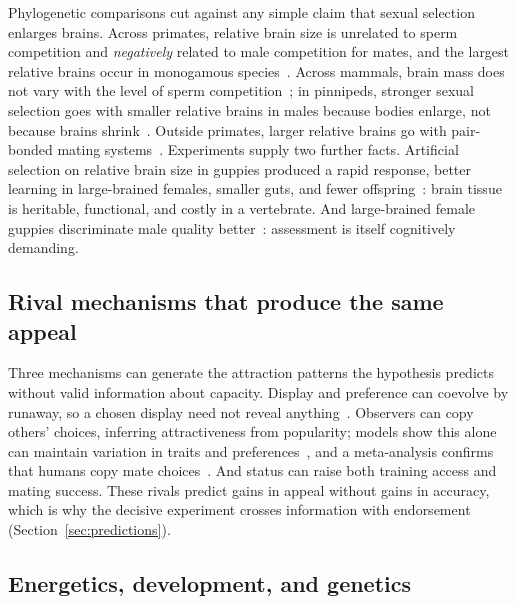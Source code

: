 Phylogenetic comparisons cut against any simple claim that sexual selection enlarges brains. Across primates, relative
brain size is unrelated to sperm competition and \emph{negatively} related to male competition for mates, and the largest
relative brains occur in monogamous species~\cite{schillaci2006}. Across mammals, brain mass does not vary with the level of
sperm competition~\cite{lemaitre2009}; in pinnipeds, stronger sexual selection goes with smaller relative brains in males
because bodies enlarge, not because brains shrink~\cite{fitzpatrick2012}. Outside primates, larger relative brains go with
pair-bonded mating systems~\cite{shultz2007}. Experiments supply two further facts. Artificial selection on relative brain
size in guppies produced a rapid response, better learning in large-brained females, smaller guts, and fewer
offspring~\cite{kotrschal2013}: brain tissue is heritable, functional, and costly in a vertebrate. And large-brained female
guppies discriminate male quality better~\cite{corrallopez2017}: assessment is itself cognitively demanding.

\subsection{Rival mechanisms that produce the same appeal}

Three mechanisms can generate the attraction patterns the hypothesis predicts without valid information about capacity.
Display and preference can coevolve by runaway, so a chosen display need not reveal anything~\cite{lande1981}. Observers can
copy others' choices, inferring attractiveness from popularity; models show this alone can maintain variation in traits and
preferences~\cite{duval2023}, and a meta-analysis confirms that humans copy mate choices~\cite{gouda2018}. And status can
raise both training access and mating success. These rivals predict gains in appeal without gains in accuracy, which is why
the decisive experiment crosses information with endorsement (Section~\ref{sec:predictions}).

\subsection{Energetics, development, and genetics}

